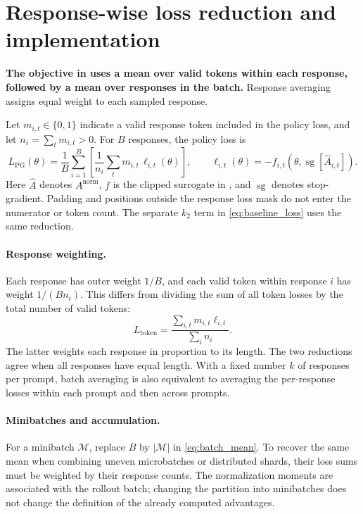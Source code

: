 \section{Response-wise loss reduction and implementation}\label{appendix:batch_mean}
\textbf{The objective in  uses a mean over valid tokens within each response, followed by a mean over responses in the batch.} Response averaging assigns equal weight to each sampled response.

Let $m_{i,t}\in\{0,1\}$ indicate a valid response token included in the policy loss, and let $n_i=\sum_t m_{i,t}>0$. For $B$ responses, the policy loss is
\begin{equation}
 \boxed{
 L_{\mathrm{PG}}(\theta)=\frac{1}{B}\sum_{i=1}^{B}
 \left[\frac{1}{n_i}\sum_t m_{i,t}\,\ell_{i,t}(\theta)\right],
 \qquad
 \ell_{i,t}(\theta)=-f_{i,t}(\theta,\operatorname{sg}[\widehat A_{i,t}]).
 }
 \label{eq:batch_mean}
\end{equation}
Here $\widehat A$ denotes $A^{\mathrm{norm}}$,  $f$ is the clipped surrogate in , and $\operatorname{sg}$ denotes stop-gradient. Padding and positions outside the response loss mask do not enter the numerator or token count. The separate $k_2$ term in \cref{eq:baseline_loss} uses the same reduction.

\paragraph{Response weighting.}
Each response has outer weight $1/B$, and each valid token within response $i$ has weight $1/(Bn_i)$. This differs from dividing the sum of all token losses by the total number of valid tokens:
\begin{equation}
 L_{\mathrm{token}}=\frac{\sum_{i,t}m_{i,t}\ell_{i,t}}{\sum_i n_i}.
\end{equation}
The latter weights each response in proportion to its length. The two reductions agree when all responses have equal length. With a fixed number $k$ of responses per prompt, batch averaging is also equivalent to averaging the per-response losses within each prompt and then across prompts.

\paragraph{Minibatches and accumulation.}
For a minibatch $\mathcal M$, replace $B$ by $|\mathcal M|$ in \cref{eq:batch_mean}. To recover the same mean when combining uneven microbatches or distributed shards, their loss sums must be weighted by their response counts. The normalization moments are associated with the rollout batch; changing the partition into minibatches does not change the definition of the already computed advantages.

